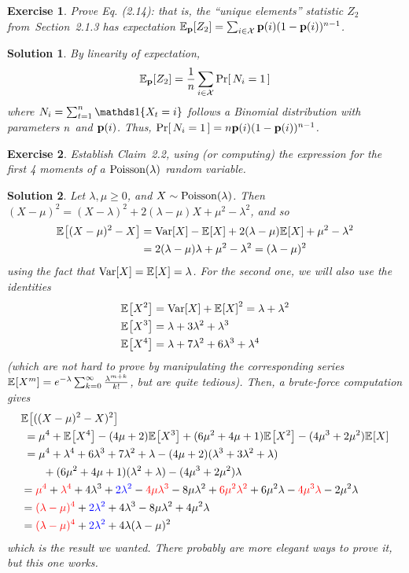 \documentclass[biber,plain]{nowfnt} %
\newtheorem{question}{Exercise}[chapter]
\newtheorem{solution}{Solution}[chapter]
\begin{document}
\begin{question}\label{ex:expectation:z2} 
  Prove Eq. (2.14): that is, the ``unique elements'' statistic $Z_2$ from~Section~2.1.3 has expectation $\bE{\p}{Z_2} = \sum_{i\in\domain} \p(i)(1-\p(i))^{\ns-1}$.
\end{question}
\begin{solution}
By linearity of expectation,
\[
\bE{\p}{Z_2} = \frac{1}{\ns}\sum_{i\in\domain} \probaOf{N_i = 1}
\]
where $N_i = \sum_{t=1}^\ns \indic{X_t=i}$ follows a Binomial distribution with parameters $n$ and $\mathbf{p}(i)$. Thus, $\probaOf{N_i = 1} = \ns \p(i)(1-\p(i))^{\ns-1}$.
\end{solution}
\begin{question}\label{ex:uniformity:moments:poisson}
  Establish Claim~2.2, using (or computing) the expression for the first 4 moments of a $\poisson{\lambda}$ random variable.
\end{question}
\begin{solution}
Let $\lambda,\mu\geq 0$, and $X\sim\poisson{\lambda}$. Then $(X-\mu)^2 = (X-\lambda)^2 + 2(\lambda-\mu)X + \mu^2-\lambda^2$, and so
\begin{align*}
	\bEE{(X-\mu)^2 - X} &= \Var[X] - \bEE{X} + 2(\lambda-\mu)\bEE{X} + \mu^2-\lambda^2 \\
	&= 2(\lambda-\mu)\lambda + \mu^2-\lambda^2
	= (\lambda-\mu)^2
\end{align*}
using the fact that $\Var[X] = \bEE{X} = \lambda$. For the second one, we will also use the identities
\begin{align*}
\bEE{X^2} &= \Var[X] + \bEE{X}^2 = \lambda+\lambda^2\\
\bEE{X^3} &= \lambda+3\lambda^2+\lambda^3\\
\bEE{X^4} &= \lambda+7\lambda^2+6\lambda^3+\lambda^4
\end{align*}
(which are not hard to prove by manipulating the corresponding series $\bEE{X^m} = e^{-\lambda} \sum_{k=0}^{\infty} \frac{\lambda^{m+k}}{k!}$, but are quite tedious).
Then, a brute-force computation gives
\begin{align*}
	&\bEE{((X-\mu)^2 - X)^2} \\
	&\;= 
	\mu^4+\bEE{X^4} - (4\mu+2)\bEE{X^3} + (6\mu^2+4\mu+1)\bEE{X^2} - (4\mu^3+2\mu^2)\bEE{X} \\
	&\;= 
	\mu^4+\lambda^4+6\lambda^3+7\lambda^2+\lambda
	- (4\mu+2)(\lambda^3 + 3\lambda^2 + \lambda) \\
	&\qquad+ (6\mu^2+4\mu+1)(\lambda^2+\lambda) - (4\mu^3+2\mu^2)\lambda \\
	&= \textcolor{red}{\mu^4}+\textcolor{red}{\lambda^4}+4\lambda^3+\textcolor{blue}{2\lambda^2} - \textcolor{red}{4\mu\lambda^3} - 8\mu\lambda^2 + \textcolor{red}{6\mu^2\lambda^2}+6\mu^2\lambda - \textcolor{red}{4\mu^3\lambda}-2\mu^2\lambda \\
	&= \textcolor{red}{(\lambda-\mu)^4} + \textcolor{blue}{2\lambda^2}
	+4\lambda^3- 8\mu\lambda^2+4\mu^2\lambda  \\
	&= \textcolor{red}{(\lambda-\mu)^4} + \textcolor{blue}{2\lambda^2}
	+4\lambda(\lambda-\mu)^2
\end{align*}
which is the result we wanted. There probably are more elegant ways to prove it, but this one works.
\end{solution}
\end{document}
